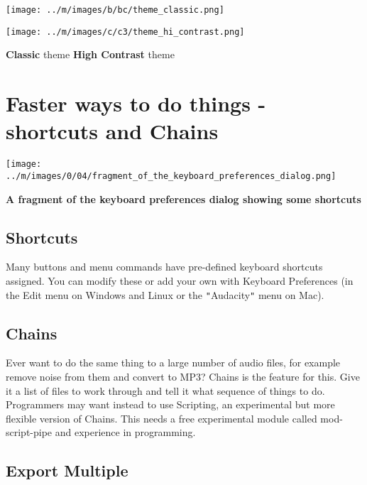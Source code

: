\documentclass[twocolumn]{book}
\begin{document}

\* \* \* \* \par\texttt{[image: ../m/images/b/bc/theme\_classic.png]}\par
\* \* \* \* \par\texttt{[image: ../m/images/c/c3/theme\_hi\_contrast.png]}\par
\* \* \* \* 
\textbf{Classic} theme
\* \* \* \* 
\textbf{High Contrast} theme




\section{Faster ways to do things - shortcuts and Chains}

\par\texttt{[image: ../m/images/0/04/fragment\_of\_the\_keyboard\_preferences\_dialog.png]}\par\textbf{A fragment of the keyboard preferences dialog showing some shortcuts}

\subsection{Shortcuts}


Many buttons and menu commands have pre-defined keyboard shortcuts assigned.  You can modify these or add your own with Keyboard Preferences (in the Edit menu on Windows and Linux or the \texttt{{}"{}}Audacity\texttt{{}"{}} menu on Mac). 

\subsection{Chains}


Ever want to do the same thing to a large number of audio files, for example remove noise from them and convert to MP3?  Chains is the feature for this. Give it a list of files to work through and tell it what sequence of things to do. Programmers may want instead to use Scripting, an experimental but more flexible version of Chains. This needs a free experimental module called mod-script-pipe and experience in programming.

\subsection{Export Multiple}
\end{document}
